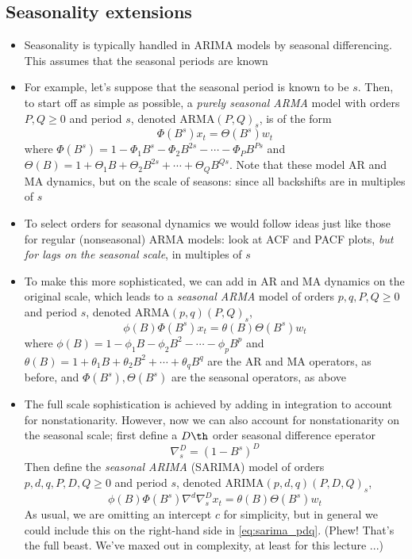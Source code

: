 \documentclass{article}
\begin{document}
\subsection{Seasonality extensions}

\begin{itemize}
\item Seasonality is typically handled in ARIMA models by seasonal
  differencing. This assumes that the seasonal periods are known

\item For example, let's suppose that the seasonal period is known to be
  $s$. Then, to start off as simple as possible, a \emph{purely seasonal ARMA}
  model with orders $P,Q \geq 0$ and period $s$, denoted ARMA$(P,Q)_s$, is of 
  the form   
  \begin{equation}
  \label{eq:pure_sarma_pq}
  \Phi(B^s) x_t = \Theta(B^s) w_t  
  \end{equation}
  where $\Phi(B^s) = 1 - \Phi_1 B^s - \Phi_2 B^{2s} - \cdots - \Phi_P B^{Ps}$
  and $\Theta(B) = 1 + \Theta_1 B + \Theta_2 B^{2s} + \cdots + \Theta_Q
  B^{Qs}$. Note that these model AR and MA dynamics, but on the scale of
  seasons: since all backshifts are in multiples of $s$

\item To select orders for seasonal dynamics we would follow ideas just like
  those for regular (nonseasonal) ARMA models: look at ACF and PACF plots,
  \emph{but for lags on the seasonal scale}, in multiples of $s$ 

\item To make this more sophisticated, we can add in AR and MA dynamics on
  the original scale, which leads to a \emph{seasonal ARMA} model of orders 
  $p,q,P,Q \geq 0$ and period $s$, denoted ARMA$(p,q)(P,Q)_s$,   
  \begin{equation}
  \label{eq:sarma_pq}
  \phi(B) \Phi(B^s) x_t = \theta(B) \Theta(B^s) w_t  
  \end{equation}
  where $\phi(B) = 1 - \phi_1 B - \phi_2 B^2 - \cdots - \phi_p B^p$ and
  $\theta(B) = 1 + \theta_1 B + \theta_2 B^2 + \cdots + \theta_q B^q$ are the AR 
  and MA operators, as before, and $\Phi(B^s), \Theta(B^s)$ are the seasonal
  operators, as above

\item The full scale sophistication is achieved by adding in integration to
  account for nonstationarity. However, now we can also account for
  nonstationarity on the seasonal scale; first define a $D\th$ order seasonal
  difference eperator
  \[
  \nabla_s^D = (1 - B^s)^D 
  \]
  Then define the \emph{seasonal ARIMA} (SARIMA) model of orders $p,d,q,P,D,Q 
  \geq 0$ and period $s$, denoted ARIMA$(p,d,q)(P,D,Q)_s$, 
  \begin{equation}
  \label{eq:sarima_pdq}
  \phi(B) \Phi(B^s) \nabla^d \nabla_s^D x_t = \theta(B) \Theta(B^s) w_t  
  \end{equation}
  As usual, we are omitting an intercept $c$ for simplicity, but in general we
  could include this on the right-hand side in \eqref{eq:sarima_pdq}. (Phew!
  That's the full beast. We've maxed out in complexity, at least for this
  lecture ...) 


\end{itemize}
\end{document}
